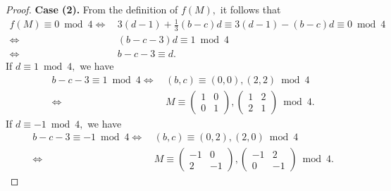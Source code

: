 \documentclass[12pt]{article}
\theoremstyle{definition}
\numberwithin{equation}{section}
\numberwithin{theorem}{section}
\begin{document}
\begin{proof}
{\bf Case (2).}
From the definition of $f(M),$ it follows that 
\begin{align*}
f(M)\equiv 0 \bmod{4}
\Longleftrightarrow&\, 
3(d-1)+\frac13(b-c)d
\equiv 
3(d-1)-(b-c)d \equiv 0 \bmod{4}  \\
\Longleftrightarrow&\, 
(b-c-3)d\equiv 1 \bmod{4}  \\
\Longleftrightarrow&\, 
b-c-3\equiv d.
\end{align*}
If $d\equiv 1 \bmod{4},$ 
we have 
\begin{align*}
b-c-3\equiv 1 \bmod{4}
\Longleftrightarrow&\,
(b,c)\equiv (0,0), (2,2) \bmod{4}   \\
\Longleftrightarrow&\,
M
\equiv
\begin{pmatrix}
1 & 0\\
0 & 1
\end{pmatrix}, 
\begin{pmatrix}
1 & 2\\
2 & 1
\end{pmatrix} \bmod{4}. 
\end{align*}
If $d\equiv -1 \bmod{4},$ 
we have 
\begin{align*}
b-c-3\equiv -1 \bmod{4}
\Longleftrightarrow&\,
(b,c)\equiv (0,2), (2,0) \bmod{4}   \\
\Longleftrightarrow&\,
M
\equiv
\begin{pmatrix}
-1 & 0\\
2 & -1
\end{pmatrix}, 
\begin{pmatrix}
-1 & 2\\
0 & -1
\end{pmatrix} \bmod{4}. 
\end{align*}
\end{proof}
\end{document}

